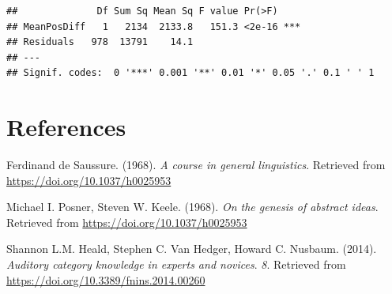 \documentclass[
  man,floatsintext]{apa6}
\newlength{\cslhangindent}
\newlength{\cslentryspacingunit} %
\newenvironment{CSLReferences}[2] %
 {%
  \setlength{\parindent}{0pt}
  \ifodd #1
  \let\oldpar\par
  \def\par{\hangindent=\cslhangindent\oldpar}
  \fi
  \setlength{\parskip}{#2\cslentryspacingunit}
 }%
 {}
\begin{document}
\begin{verbatim}
##              Df Sum Sq Mean Sq F value Pr(>F)    
## MeanPosDiff   1   2134  2133.8   151.3 <2e-16 ***
## Residuals   978  13791    14.1                   
## ---
## Signif. codes:  0 '***' 0.001 '**' 0.01 '*' 0.05 '.' 0.1 ' ' 1
\end{verbatim}

\hypertarget{references}{%
\section{References}\label{references}}

\hypertarget{refs}{}
\begin{CSLReferences}{1}{0}
\leavevmode{}%
Ferdinand de Saussure. (1968). \emph{A course in general linguistics}. Retrieved from \url{https://doi.org/10.1037/h0025953}

\leavevmode{}%
Michael I. Posner, Steven W. Keele. (1968). \emph{On the genesis of abstract ideas}. Retrieved from \url{https://doi.org/10.1037/h0025953}

\leavevmode{}%
Shannon L.M. Heald, Stephen C. Van Hedger, Howard C. Nusbaum. (2014). \emph{Auditory category knowledge in experts and novices}. \emph{8}. Retrieved from \url{https://doi.org/10.3389/fnins.2014.00260}

\end{CSLReferences}
\end{document}
